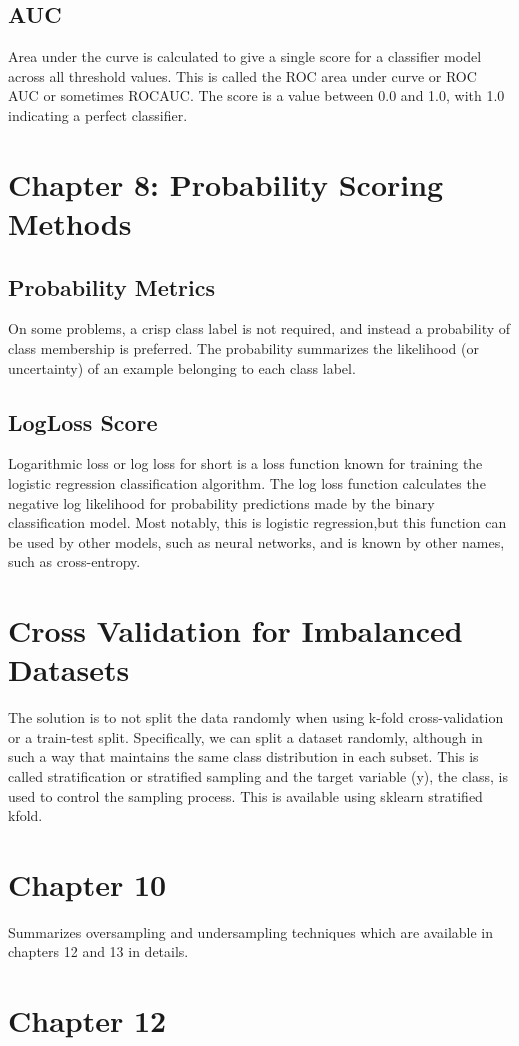 \documentclass{article}
\begin{document}
\subsection{AUC}
Area under the curve is calculated to give a single score for a classifier model across all threshold values. This is called the ROC area under curve or ROC AUC or sometimes ROCAUC. The score is a value between 0.0 and 1.0, with 1.0 indicating a perfect classifier.
\section{Chapter 8: Probability Scoring Methods}
\subsection{Probability Metrics}
On some problems, a crisp class label is not required, and instead a probability of class membership is preferred. The probability summarizes the likelihood (or uncertainty) of an example belonging to each class label. 
\subsection{LogLoss Score}
Logarithmic loss or log loss for short is a loss function known for training the logistic regression classification algorithm. The log loss function calculates the negative log likelihood for probability predictions made by the binary classification model. Most notably, this is logistic regression,but this function can be used by other models, such as neural networks, and is known by other names, such as cross-entropy.
\section{Cross Validation for Imbalanced Datasets}
The solution is to not split the data randomly when using k-fold cross-validation or a train-test split. Specifically, we can split a dataset randomly, although in such a way that maintains the same class distribution in each subset. This is called stratification or stratified sampling and the target variable (y), the class, is used to control the sampling process. This is available using sklearn stratified kfold.
\section{Chapter 10}
Summarizes oversampling and undersampling techniques which are available in chapters 12 and 13 in details.
\section{Chapter 12}
\end{document}
